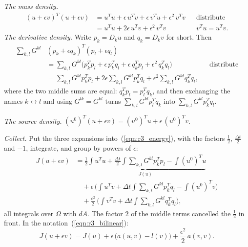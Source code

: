 \emph{The mass density.}
\begin{align*}
(u + \epsilon v)^T(u + \epsilon v) &= u^Tu + \epsilon\, u^Tv + \epsilon\, v^Tu + \epsilon^2\, v^Tv && \text{distribute} \\
&= u^Tu + 2\epsilon\, u^Tv + \epsilon^2\, v^Tv && v^Tu = u^Tv .
\end{align*}
\emph{The derivative density.} Write $p_k = D_ku$ and $q_k = D_kv$ for short. Then
\begin{align*}
\sum_{k,l} G^{kl}&(p_k + \epsilon q_k)^T(p_l + \epsilon q_l) \\
&= \sum_{k,l} G^{kl}\Big(p_k^Tp_l + \epsilon\, p_k^Tq_l + \epsilon\, q_k^Tp_l + \epsilon^2\, q_k^Tq_l\Big) && \text{distribute} \\
&= \sum_{k,l} G^{kl}p_k^Tp_l + 2\epsilon\sum_{k,l} G^{kl}p_k^Tq_l + \epsilon^2\sum_{k,l} G^{kl}q_k^Tq_l ,
\end{align*}
where the two middle sums are equal: $q_k^Tp_l = p_l^Tq_k$, and then exchanging the names $k \leftrightarrow l$ and using $G^{lk} = G^{kl}$ turns $\sum_{k,l} G^{kl}p_l^Tq_k$ into $\sum_{k,l} G^{kl}p_k^Tq_l$.

\emph{The source density.} $(u^0)^T(u + \epsilon v) = (u^0)^Tu + \epsilon\,(u^0)^Tv$.

\emph{Collect.} Put the three expansions into~(\ref{eqn:r3_energy}), with the factors $\frac12$, $\frac{\Delta t}{2}$ and $-1$, integrate, and group by powers of $\epsilon$:
\begin{align*}
J(u + \epsilon v) &= \underbrace{\frac12\int u^Tu + \frac{\Delta t}{2}\int\sum_{k,l} G^{kl}p_k^Tp_l - \int(u^0)^Tu}_{J(u)} \\
&\quad + \epsilon\,\Big(\int u^Tv + \Delta t\int\sum_{k,l} G^{kl}p_k^Tq_l - \int(u^0)^Tv\Big) \\
&\quad + \frac{\epsilon^2}{2}\,\Big(\int v^Tv + \Delta t\int\sum_{k,l} G^{kl}q_k^Tq_l\Big) ,
\end{align*}
all integrals over $\Omega$ with $dA$. The factor $2$ of the middle terms cancelled the $\frac12$ in front. In the notation~(\ref{eqn:r3_bilinear}):
\begin{equation}
\label{eqn:s3a_variation}
J(u + \epsilon v) = J(u) + \epsilon\,\big(a(u, v) - l(v)\big) + \frac{\epsilon^2}{2}\, a(v, v) .
\end{equation}
